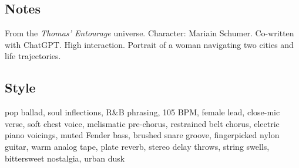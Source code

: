 \subsection{Notes}
From the \emph{Thomas' Entourage} universe.
Character: Mariain Schumer.
Co-written with ChatGPT. High interaction.
Portrait of a woman navigating two cities and life trajectories.

\subsection{Style}
pop ballad, soul inflections, R\&B phrasing, 105 BPM, female lead, close-mic verse, soft chest voice, melismatic pre-chorus, restrained belt chorus, electric piano voicings, muted Fender bass, brushed snare groove, fingerpicked nylon guitar, warm analog tape, plate reverb, stereo delay throws, string swells, bittersweet nostalgia, urban dusk

